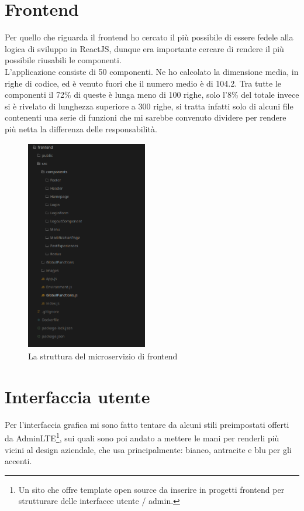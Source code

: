 \section{Frontend}
Per quello che riguarda il frontend ho cercato il più possibile di essere fedele alla logica di sviluppo in ReactJS, dunque era importante cercare di rendere il più possibile riusabili le componenti.
\\
L'applicazione consiste di 50 componenti. Ne ho calcolato la dimensione media, in righe di codice, ed è venuto fuori che il numero medio è di 104.2. Tra tutte le componenti il 72\% di queste è lunga meno di 100 righe, solo l'8\% del totale invece si è rivelato di lunghezza superiore a 300 righe, si tratta infatti solo di alcuni file contenenti una serie di funzioni che mi sarebbe convenuto dividere per rendere più netta la differenza delle responsabilità.

\begin{figure}[h]
    \centering
    \includegraphics[width=200px, height=350px]{./images/frontend_filesystem.png}
    \caption{La struttura del microservizio di frontend}
    \label{fig:frontend}
\end{figure}



\section{Interfaccia utente}
Per l'interfaccia grafica mi sono fatto tentare da alcuni stili preimpostati offerti da AdminLTE\footnote{
Un sito che offre template open source da inserire in progetti frontend per strutturare delle interfacce utente / admin.\cite{AdminLTE}
}, sui quali sono poi andato a mettere le mani per renderli più vicini al design aziendale, che usa principalmente: bianco, antracite e blu per gli accenti.

